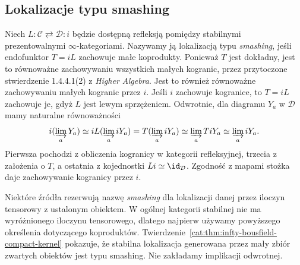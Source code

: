 \subsection{Lokalizacje typu smashing}

\begin{definicja}\label{cat:def:infty-bousfield-smashing}
Niech $L:\mathcal C\rightleftarrows\mathcal D:i$ będzie dostępną refleksją pomiędzy stabilnymi prezentowalnymi $\infty$-kategoriami. Nazywamy ją lokalizacją typu \emph{smashing}, jeśli endofunktor $T=iL$ zachowuje małe koprodukty. Ponieważ $T$ jest dokładny, jest to równoważne zachowywaniu wszystkich małych kogranic, przez przytoczone stwierdzenie 1.4.4.1(2) z \emph{Higher Algebra}. Jest to również równoważne zachowywaniu małych kogranic przez $i$. Jeśli $i$ zachowuje kogranice, to $T=iL$ zachowuje je, gdyż $L$ jest lewym sprzężeniem. Odwrotnie, dla diagramu $Y_a$ w $\mathcal D$ mamy naturalne równoważności
\[
 i(\varinjlim_a Y_a)
 \simeq iL(\varinjlim_a iY_a)
 =T(\varinjlim_a iY_a)
 \simeq\varinjlim_a TiY_a
 \simeq\varinjlim_a iY_a.
\]
Pierwsza pochodzi z obliczenia kogranicy w kategorii refleksyjnej, trzecia z założenia o $T$, a ostatnia z kojednostki $Li\simeq\id_{\mathcal D}$. Zgodność z mapami stożka daje zachowywanie kogranicy przez $i$.
\end{definicja}

Niektóre źródła rezerwują nazwę \emph{smashing} dla lokalizacji danej przez iloczyn tensorowy z ustalonym obiektem. W ogólnej kategorii stabilnej nie ma wyróżnionego iloczynu tensorowego, dlatego najpierw używamy powyższego określenia dotyczącego koproduktów. Twierdzenie~\ref{cat:thm:infty-bousfield-compact-kernel} pokazuje, że stabilna lokalizacja generowana przez mały zbiór zwartych obiektów jest typu smashing. Nie zakładamy implikacji odwrotnej.

